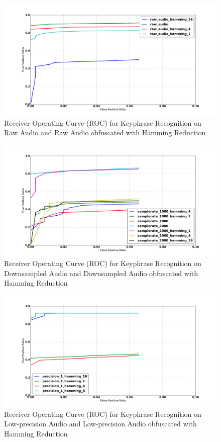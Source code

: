 
\begin{figure}[!th]
\includegraphics[width=\textwidth]{sound/roc_raw_audio.pdf}
\caption{Receiver Operating Curve (ROC) for Keyphrase Recognition on Raw Audio and Raw Audio obfuscated with Hamming Reduction}
\label{fig:roc_raw_audio}
\end{figure}



\begin{figure}[!th]
\includegraphics[width=\textwidth]{sound/roc_samplerate.pdf}
\caption{Receiver Operating Curve (ROC) for Keyphrase Recognition on Downsampled Audio and Downsampled Audio obfuscated with Hamming Reduction}
\label{fig:roc_samplerate}
\end{figure}



\begin{figure}[!th]
\includegraphics[width=\textwidth]{sound/roc_precision_bits.pdf}
\caption{Receiver Operating Curve (ROC) for Keyphrase Recognition on Low-precision Audio and Low-precision Audio obfuscated with Hamming Reduction}
\label{fig:roc_precision_bits}
\end{figure}
